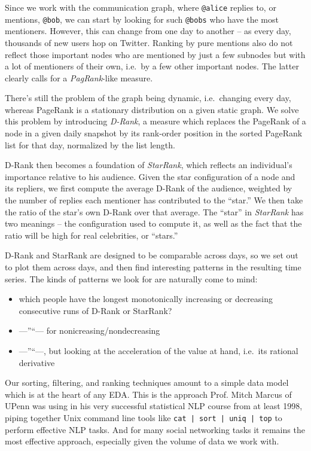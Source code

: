 \documentclass[10pt,oneside]{memoir}
\begin{document}
Since we work with the communication graph, where \texttt{@alice} replies to, or mentions, \texttt{@bob}, we can start by looking for such \texttt{@bobs} who have the most mentioners.  However, this can change from one day to another -- as every day, thousands of new users hop on Twitter.  Ranking by pure mentions also do not reflect those important nodes who are mentioned by just a few subnodes but with a lot of mentioners of their own, i.e.\ by a few other important nodes.  The latter clearly calls for a {\itshape PagRank}-like measure.  


There's still the problem of the graph being dynamic, i.e.\ changing every day, whereas PageRank is a stationary distribution on a given static graph.  We solve this problem by introducing {\itshape D-Rank}, a measure which replaces the PageRank of a node in a given daily snapshot by its rank-order position in the sorted PageRank list for that day, normalized by the list length.


D-Rank then becomes a foundation of {\itshape StarRank}, which reflects an individual's importance relative to his audience.  Given the star configuration of a node and its repliers, we first compute the average D-Rank of the audience, weighted by the number of replies each mentioner has contributed to the ``star.''  We then take the ratio of the star's own D-Rank over that average.  The ``star'' in {\itshape StarRank} has two meanings -- the configuration used to compute it, as well as the fact that the ratio will be high for real celebrities, or ``stars.''  


D-Rank and StarRank are designed to be comparable across days, so we set out to plot them across days, and then find interesting patterns in the resulting time series.  The kinds of patterns we look for are naturally come to mind:


\begin{itemize}


\item which people have the longest monotonically increasing or decreasing consecutive runs of D-Rank or StarRank?

\item ---''``--- for nonicreasing/nondecreasing

\item ---''``---, but looking at the acceleration of the value at hand, i.e.\ its rational derivative
\end{itemize}

Our sorting, filtering, and ranking techniques amount to a simple data model which is at the heart of any EDA.  This is the approach Prof. Mitch Marcus of UPenn was using in his very successful statistical NLP course from at least 1998, piping together Unix command line tools like \texttt{cat | sort | uniq | top} to perform effective NLP tasks.  And for many social networking tasks it remains the most effective approach, especially given the volume of data we work with.  
\end{document}
